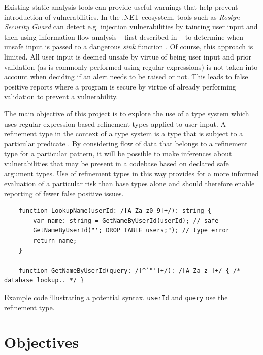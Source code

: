 \documentclass[a4paper]{article}
\begin{document}
    Existing static analysis tools can provide useful warnings that help prevent introduction of vulnerabilities. In the .NET ecosystem, tools such as \emph{Roslyn Security Guard} can detect e.g. injection vulnerabilities by tainting user input and then using information flow analysis -- first described in \cite{denning1977certification} -- to determine when unsafe input is passed to a dangerous \emph{sink} function \citep{rosylynsecguard}. Of course, this approach is limited. All user input is deemed unsafe by virtue of being user input and prior validation (as is commonly performed using regular expressions) is not taken into account when deciding if an alert needs to be raised or not. This leads to false positive reports where a program is secure by virtue of already performing validation to prevent a vulnerability.
    
    The main objective of this project is to explore the use of a type system which uses regular-expression based refinement types applied to user input. A refinement type in the context of a type system is a type that is subject to a particular predicate \citep[p. 207]{benjaminpierce2002}. By considering flow of data that belongs to a refinement type for a particular pattern, it will be possible to make inferences about vulnerabilities that may be present in a codebase based on declared safe argument types. Use of refinement types in this way provides for a more informed evaluation of a particular risk than base types alone and should therefore enable reporting of fewer false positive issues.
    
    \begin{listing}[H]
    \begin{verbatim}
    function LookupName(userId: /[A-Za-z0-9]+/): string {
        var name: string = GetNameByUserId(userId); // safe
        GetNameByUserId("'; DROP TABLE users;"); // type error
        return name;
    }
    
    function GetNameByUserId(query: /[^`"']+/): /[A-Za-z ]+/ { /* database lookup.. */ }
    \end{verbatim}
    \caption{Example code illustrating a potential syntax. \texttt{userId} and \texttt{query} use the refinement type.}
    \end{listing}
    \section*{Objectives}
    
\end{document}
